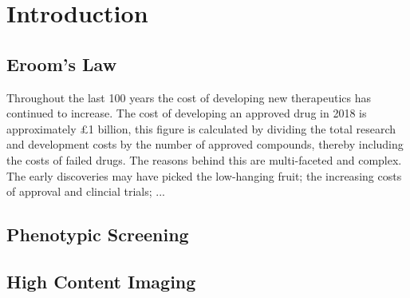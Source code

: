 \documentclass[a4paper,11pt,twoside,openright]{scrbook}
\begin{document}
\chapter{Introduction} \label{chapter:intro}

\section{Eroom's Law}
Throughout the last 100 years the cost of developing new therapeutics has continued to increase.
The cost of developing an approved drug in 2018 is approximately £1 billion, this figure is calculated by dividing the total research and development costs by the number of approved compounds, thereby including the costs of failed drugs.
The reasons behind this are multi-faceted and complex.
The early discoveries may have picked the low-hanging fruit; the increasing costs of approval and clincial trials; ...



\section{Phenotypic Screening}

\section{High Content Imaging}
\end{document}
